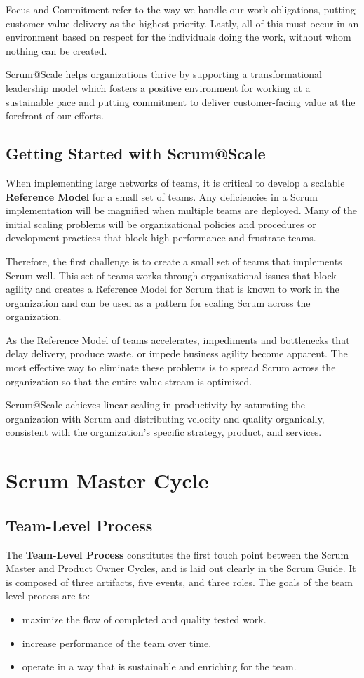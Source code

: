 \documentclass[12pt,a4paper,parskip=full]{scrartcl}
\begin{document}
Focus and Commitment refer to the way we handle our work obligations,
putting customer value delivery as the highest priority. Lastly, all of
this must occur in an environment based on respect for the individuals
doing the work, without whom nothing can be created.

Scrum@Scale helps organizations thrive by supporting a
transformational leadership model which fosters a positive environment for
working at a sustainable pace and putting commitment to deliver
customer-facing value at the forefront of our efforts.

\subsection{Getting Started with Scrum@Scale}
When implementing large networks of teams, it is critical to develop a
scalable \textbf{Reference Model} for a small set of teams. Any
deficiencies in a Scrum implementation will be magnified when multiple
teams are deployed. Many of the initial scaling problems will be organizational 
policies and procedures or development practices that block high performance and frustrate 
teams. 

Therefore, the first challenge is to create a small set of teams that
implements Scrum well. This set of teams works through organizational
issues that block agility and creates a Reference Model for Scrum that is
known to work in the organization and can be used as a pattern for scaling
Scrum across the organization.

As the Reference Model of teams accelerates, impediments and bottlenecks
that delay delivery, produce waste, or impede business agility become
apparent. The most effective way to eliminate these problems is to spread
Scrum across the organization so that the entire value stream is optimized.

Scrum@Scale achieves linear scaling in productivity by saturating the
organization with Scrum and distributing velocity and quality organically,
consistent with the organization's specific strategy, product, and services.

\section{Scrum Master Cycle}
\subsection{Team-Level Process}
The \textbf{Team-Level Process} constitutes the first touch point between the Scrum Master and Product Owner Cycles, and is laid out clearly in the Scrum Guide. It
is composed of three artifacts, five events, and three roles. The goals of
the team level process are to:
\begin{itemize}
\item maximize the flow of completed and quality tested work.
\item increase performance of the team over time.
\item operate in a way that is sustainable and enriching for the team.
\end{itemize}
\end{document}
